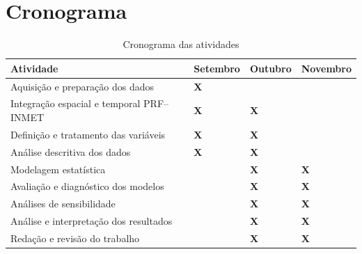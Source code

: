 \documentclass[12pt]{article}
\begin{document}
\section{Cronograma}\label{sec:cronograma}

\begin{table}[H]    
\centering
    \caption{Cronograma das atividades}
    \label{tab:cronograma}

    \small
    \renewcommand{\arraystretch}{1.25}
    \setlength{\tabcolsep}{4pt}

    \begin{tabularx}{\textwidth}{
        >{\RaggedRight\arraybackslash}X
        >{\centering\arraybackslash}p{1.7cm}
        >{\centering\arraybackslash}p{1.7cm}
        >{\centering\arraybackslash}p{1.7cm}
    }
        \toprule

        \textbf{Atividade} &
        \textbf{Setembro} &
        \textbf{Outubro} &
        \textbf{Novembro} \\

        \midrule

        Aquisição e preparação dos dados
        & \textbf{X} & & \\

        Integração espacial e temporal PRF--INMET
        & \textbf{X} & \textbf{X} & \\

        Definição e tratamento das variáveis
        & \textbf{X} & \textbf{X} & \\

        Análise descritiva dos dados
        & \textbf{X} & \textbf{X} & \\

        Modelagem estatística
        & & \textbf{X} & \textbf{X} \\

        Avaliação e diagnóstico dos modelos
        & & \textbf{X} & \textbf{X} \\

        Análises de sensibilidade
        & & \textbf{X} & \textbf{X} \\

        Análise e interpretação dos resultados
        & & \textbf{X} & \textbf{X} \\

        Redação e revisão do trabalho
        & & \textbf{X} & \textbf{X} \\

        \bottomrule
    \end{tabularx}
\end{table}
\end{document}
